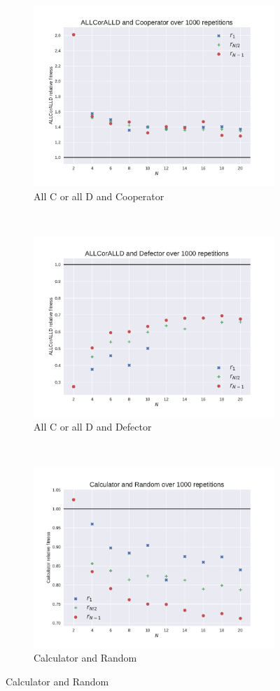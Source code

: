 \documentclass{article}
\begin{document}
\begin{figure}[!hbtp]
    \begin{subfigure}[t]{.3\textwidth}
        \centering
        \includegraphics[width=.8\textwidth]{./img/ALLCorALLD_v_Cooperator_fitness.pdf}
        \caption{All C or all D and Cooperator}
    \end{subfigure}%
    ~
    \begin{subfigure}[t]{.3\textwidth}
        \centering
        \includegraphics[width=.8\textwidth]{./img/ALLCorALLD_v_Defector_fitness.pdf}
        \caption{All C or all D and Defector}
    \end{subfigure}%
    ~
    \begin{subfigure}[t]{.3\textwidth}
        \centering
        \includegraphics[width=.8\textwidth]{./img/Calculator_v_Random_fitness.pdf}
        \caption{Calculator and Random}
    \end{subfigure}%


\end{figure}
\end{document}
